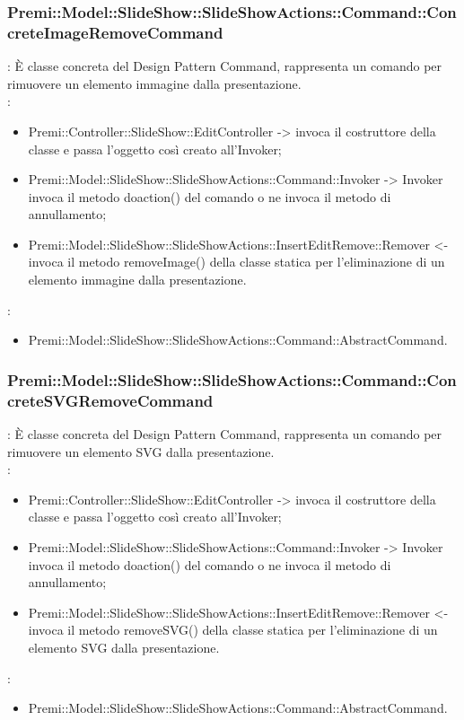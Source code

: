 {                    \subsubsection{Premi::Model::SlideShow::SlideShowActions::Command::ConcreteImageRemoveCommand}{
				\textbf{\tipo}: È classe concreta del Design Pattern Command, rappresenta un comando per rimuovere un elemento immagine dalla presentazione.\\	
				\textbf{\relaz}: 
				\begin{itemize}
					\item Premi::Controller::SlideShow::EditController -> invoca il costruttore della classe e passa l’oggetto così creato all’Invoker;
					\item Premi::Model::SlideShow::SlideShowActions::Command::Invoker -> Invoker invoca il metodo doaction() del comando o ne invoca il metodo di annullamento;
                    \item Premi::Model::SlideShow::SlideShowActions::InsertEditRemove::Remover <- invoca il metodo removeImage() della classe statica per l’eliminazione di un elemento immagine dalla presentazione.
				\end{itemize}	
                \textbf{\base}: 
                    \begin{itemize}
                    \item Premi::Model::SlideShow::SlideShowActions::Command::AbstractCommand.
                    \end{itemize}
                    }               
                    \subsubsection{Premi::Model::SlideShow::SlideShowActions::Command::ConcreteSVGRemoveCommand}{
				\textbf{\tipo}: È classe concreta del Design Pattern Command, rappresenta un comando per rimuovere un elemento SVG dalla presentazione.\\	
				\textbf{\relaz}: 
				\begin{itemize}
					\item Premi::Controller::SlideShow::EditController -> invoca il costruttore della classe e passa l’oggetto così creato all’Invoker;
					\item Premi::Model::SlideShow::SlideShowActions::Command::Invoker -> Invoker invoca il metodo doaction() del comando o ne invoca il metodo di annullamento;
                    \item Premi::Model::SlideShow::SlideShowActions::InsertEditRemove::Remover <- invoca il metodo removeSVG() della classe statica per l’eliminazione di un elemento SVG dalla presentazione.
				\end{itemize}	
                \textbf{\base}: 
                    \begin{itemize}
                    \item Premi::Model::SlideShow::SlideShowActions::Command::AbstractCommand.
                    \end{itemize}
                    }
}
